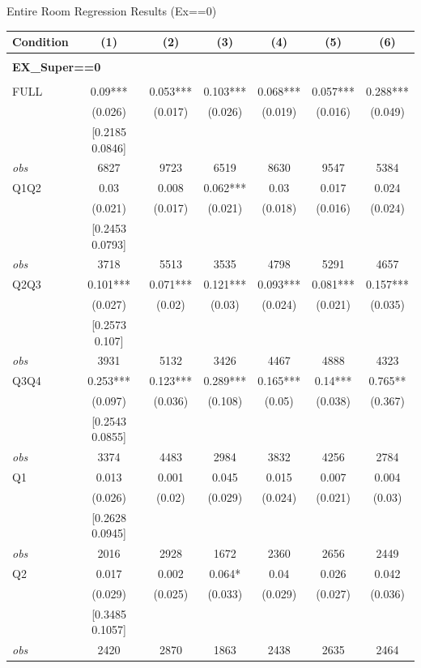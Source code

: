 \begin{table}[]
\TABLE
{Entire Room Regression Results (Ex==0) \label{result_detail2}}{\begin{tabular}{lcccccc}
\hline
Condition & (1) & (2) & (3) & (4) & (5) & (6) \\ \hline
\\ 
\multicolumn{5}{l}{\textbf{EX\_Super==0}} \\ 
\\ 
FULL & 0.09*** & 0.053*** & 0.103*** & 0.068*** & 0.057*** & 0.288*** \\ 
&(0.026)&(0.017) & (0.026)&(0.019)&(0.016)&(0.049)\\ 
& [0.2185 0.0846] & & & & & \\ 
\textit{obs} & 6827 & 9723 & 6519 & 8630 & 9547 & 5384 \\ 
Q1Q2 & 0.03 & 0.008 & 0.062*** & 0.03 & 0.017 & 0.024 \\ 
&(0.021)&(0.017) & (0.021)&(0.018)&(0.016)&(0.024)\\ 
& [0.2453 0.0793] & & & & & \\ 
\textit{obs} & 3718 & 5513 & 3535 & 4798 & 5291 & 4657 \\ 
Q2Q3 & 0.101*** & 0.071*** & 0.121*** & 0.093*** & 0.081*** & 0.157*** \\ 
&(0.027)&(0.02) & (0.03)&(0.024)&(0.021)&(0.035)\\ 
& [0.2573 0.107] & & & & & \\ 
\textit{obs} & 3931 & 5132 & 3426 & 4467 & 4888 & 4323 \\ 
Q3Q4 & 0.253*** & 0.123*** & 0.289*** & 0.165*** & 0.14*** & 0.765** \\ 
&(0.097)&(0.036) & (0.108)&(0.05)&(0.038)&(0.367)\\ 
& [0.2543 0.0855] & & & & & \\ 
\textit{obs} & 3374 & 4483 & 2984 & 3832 & 4256 & 2784 \\ 
Q1 & 0.013 & 0.001 & 0.045 & 0.015 & 0.007 & 0.004 \\ 
&(0.026)&(0.02) & (0.029)&(0.024)&(0.021)&(0.03)\\ 
& [0.2628 0.0945] & & & & & \\ 
\textit{obs} & 2016 & 2928 & 1672 & 2360 & 2656 & 2449 \\ 
Q2 & 0.017 & 0.002 & 0.064* & 0.04 & 0.026 & 0.042 \\ 
&(0.029)&(0.025) & (0.033)&(0.029)&(0.027)&(0.036)\\ 
& [0.3485 0.1057] & & & & & \\ 
\textit{obs} & 2420 & 2870 & 1863 & 2438 & 2635 & 2464 \\ 

\end{tabular}}
\end{table}
